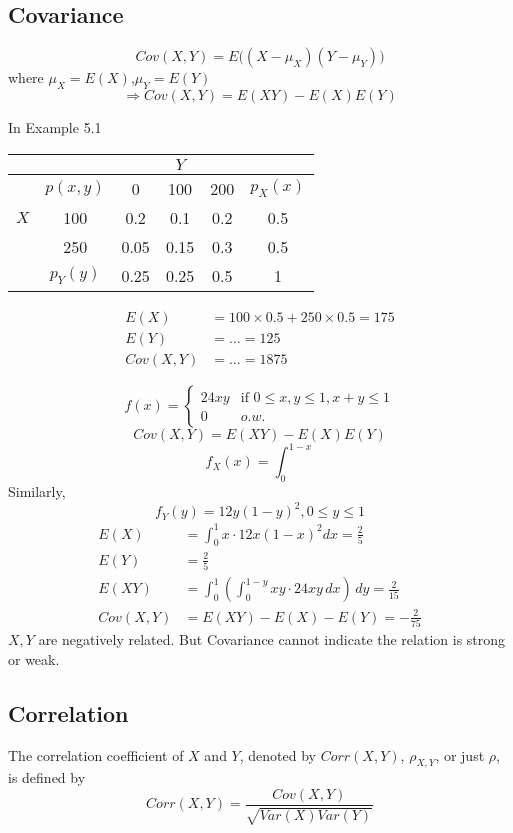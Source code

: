 \subsection{Covariance}
\begin{defn}
\[Cov(X,Y)=E\Big((X-\mu_X)(Y-\mu_Y)\Big)\]
where $\mu_X=E(X)$,$\mu_Y=E(Y)$
\[\Rightarrow Cov(X,Y)=E(XY)-E(X)E(Y)\]
\end{defn}

\begin{exmp}
In Example 5.1
\begin{center}
\begin{tabular}{|c|c|ccc|c|}
\hline
    &     &    & $Y$ &   & \\
\hline
    & $p(x,y)$ & 0    & 100  & 200 & $p_X(x)$  \\
$X$ & 100      & 0.2  & 0.1  & 0.2 & 0.5 \\
    & 250      & 0.05 & 0.15 & 0.3 & 0.5 \\
    \hline
    & $p_Y(y)$ & 0.25 & 0.25 & 0.5 & 1 \\
\hline
\end{tabular}
\end{center}
\begin{align*}
E(X)&=100\times 0.5+ 250 \times 0.5= 175 \\
E(Y)&=\dots= 125 \\
Cov(X,Y)&=\dots=1875
\end{align*}
\end{exmp}

\begin{exmp}
\[f(x)=
\begin{cases}
24xy & \text{if }0\leq x,y\leq1, x+y\leq1\\
0 & o.w. 
\end{cases}\]
\[Cov(X,Y)=E(XY)-E(X)E(Y)\]
\[f_X(x)=\int_0^{1-x}\]
Similarly,
\[f_Y(y)=12y(1-y)^2,0\leq y\leq 1\]
\begin{align*}
E(X)&=\int_0^1 x \cdot 12x(1-x)^2 dx =\frac{2}{5}\\
E(Y)&=\frac{2}{5}\\
E(XY)&=\int_0^1  \left(\int_0^{1-y} xy \cdot 24xy \,dx\right)\,dy =\frac{2}{15}\\
Cov(X,Y)&=E(XY)-E(X)-E(Y)=-\frac{2}{75}
\end{align*}
$X,Y$ are negatively related. But Covariance cannot indicate the relation is strong or weak.
\end{exmp}

\subsection{Correlation}
\begin{defn}
The correlation coefficient of $X$ and $Y$, denoted by $Corr(X, Y)$, $\rho_{X,Y}$, or just $\rho$, is defined by
\[Corr(X,Y)=\frac{Cov(X,Y)}{\sqrt{Var(X)Var(Y)}}\]
\end{defn}

